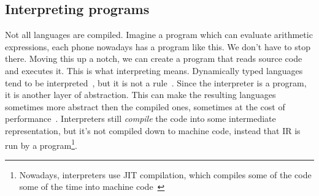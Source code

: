 \subsection{Interpreting programs}
Not all languages are compiled. Imagine a program which can evaluate arithmetic expressions, each phone nowadays has a program like this.
We don't have to stop there. Moving this up a notch, we can create a program that reads source code and executes it.
This is what interpreting means. Dynamically typed languages tend to be interpreted~\cite{python, lua, javascript}, but it is not a rule~\cite{scala}. Since the interpreter is a program, it is another layer of abstraction. This can make
the resulting languages sometimes more abstract then the compiled ones, sometimes at the cost of performance~\cite{jit}.
Interpreters still \textit{compile} the code into some intermediate representation, but it's not compiled down to machine code, instead that IR is run by a program\footnote{Nowadays, interpreters use JIT compilation, which compiles some of the code some of the time into machine code~\cite{jit}}.
